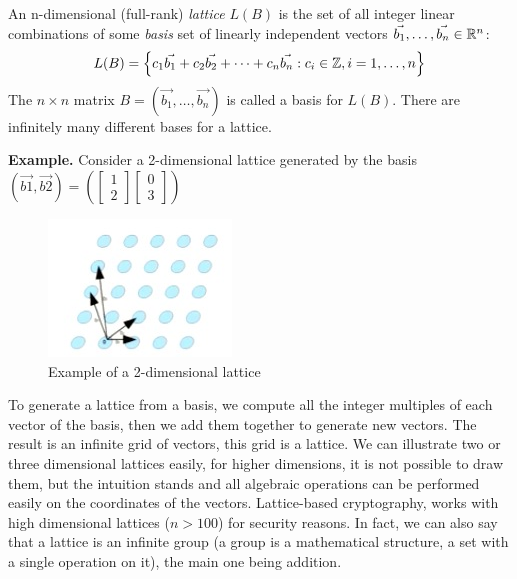 \begin{definition}[Lattice]
  An n-dimensional (full-rank) \emph{lattice} $L(B)$ is the set of all integer
  linear combinations of some \emph{basis} set of linearly independent vectors
  $\vec{b_1},\dots,\vec{b_n} \in \mathbb{R}^n$:
  \[
    L(B) = \left\{ c_1 \vec{b_1} + c_2 \vec{b_2} + \dots + c_n \vec{b_n} : c_i
      \in \mathbb{Z}, i = 1, \dots, n \right\}
  \]
  The $ n \times n$ matrix $B = (\vec{b_1},\dots, \vec{b_n})$ is called a basis
  for $L(B)$. There are infinitely many different bases for a lattice.
\end{definition}

\textbf{Example.} Consider a 2-dimensional lattice generated by the basis
$(\vec{b1}, \vec{b2}) = \left( \begin{bmatrix} 1 \\ 2
  \end{bmatrix} \begin{bmatrix} 0 \\ 3
  \end{bmatrix}\right)$
\begin{figure}[h]
  \centering \includegraphics{lattices}
  \caption{Example of a 2-dimensional lattice}
  \label{fig:2dimLattice}
\end{figure}
To generate a lattice from a basis, we compute all the integer multiples of
each vector of the basis, then we add them together to generate new vectors. The
result is an infinite grid of vectors, this grid is a lattice. We can illustrate
two or three dimensional lattices easily, for higher dimensions, it is not
possible to draw them, but the intuition stands and all 
algebraic operations can be performed easily on the coordinates of the vectors. Lattice-based cryptography, works with high dimensional lattices ($n > 100$) for
security reasons. In fact, we can also say that a lattice is an infinite
group (a group is a mathematical structure, a set with a single operation on it),
the main one being addition.

